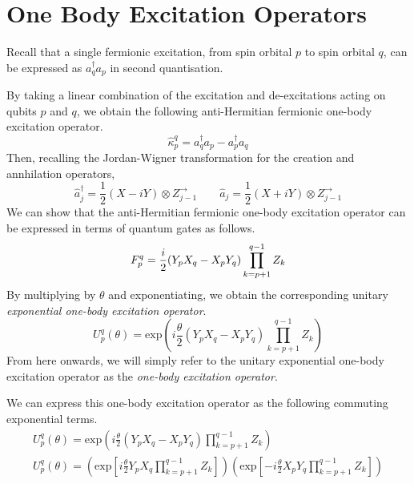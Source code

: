\section{One Body Excitation Operators}%
\label{one-body-excitation-operators}

Recall that a single fermionic excitation, from spin orbital $p$ to spin orbital $q$, can be expressed as $a^\dagger_q a_p$ in second quantisation.

By taking a linear combination of the excitation and de-excitations acting on qubits $p$ and $q$, we obtain the following anti-Hermitian fermionic one-body excitation operator.
\begin{equation*}
    \hat{\kappa}^q_p = a_q^\dagger a_p - a^\dagger_p a_q
\end{equation*}
Then, recalling the Jordan-Wigner transformation for the creation and annhilation operators,
\begin{equation*}
    \hat a_j^\dagger =
    \frac{1}{2} (X - iY) \otimes Z^\rightarrow_{j-1} \qquad
    \hat a_j =
    \frac{1}{2} (X + iY) \otimes Z^\rightarrow_{j-1}
\end{equation*}
We can show that the anti-Hermitian fermionic one-body excitation operator can be expressed in terms of quantum gates as follows.
\begin{equation*}
    F_p^q = \frac{i}{2} (Y_p X_q - X_p Y_q) \prod_{k=p+1}^{q-1} Z_k \\
\end{equation*}
By multiplying by $\theta$ and exponentiating, we obtain the corresponding unitary \textit{exponential one-body excitation operator}.
\begin{equation*}
    U^q_p (\theta) =
    \text{exp} \left( i
    \frac{\theta}{2} (Y_p X_q - X_p Y_q) \prod_{k=p+1}^{q-1} Z_k \right)
\end{equation*}
From here onwards, we will simply refer to the unitary exponential one-body excitation operator as the \textit{one-body excitation operator}.

We can express this one-body excitation operator as the following commuting exponential terms.
\begin{equation*}
\begin{gathered}
    U^q_p (\theta) =
    \text{exp} \left( i
    \frac{\theta}{2} (Y_p X_q - X_p Y_q) \prod_{k=p+1}^{q-1} Z_k \right) \\[1.5ex]
    U^q_p (\theta) =
    \left( \text{exp} \left[
    i \frac{\theta}{2} Y_p X_q \prod_{k=p+1}^{q-1} Z_k \right] \right)
    \left( \text{exp} \left[ -
    i \frac{\theta}{2} X_p Y_q \prod_{k=p+1}^{q-1} Z_k \right] \right)
\end{gathered}
\end{equation*}

